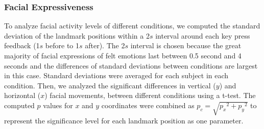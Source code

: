 \documentclass[10pt,journal,compsoc]{IEEEtran}
\begin{document}
\subsubsection{Facial Expressiveness}

To analyze facial activity levels of different conditions, we
computed the standard deviation of the landmark positions within a 2$s$
interval around each key press feedback (1$s$ before to 1$s$
after). The 2$s$ interval is chosen because the great majority of facial expressions of felt emotions last between 0.5 second and 4 seconds \cite{ekman1984expression} and the differences of standard deviations between conditions are largest in this case. Standard deviations were averaged for each
subject in each condition. Then, we analyzed the significant
differences in vertical ($y$) and horizontal ($x$) facial
movements, between different conditions using a t-test. The computed
$p$ values for $x$ and $y$ coordinates were combined as
$p_c=\sqrt{{p_x}^2+{p_y}^2}$ to represent the significance level
for each landmark position as one parameter.
\end{document}
